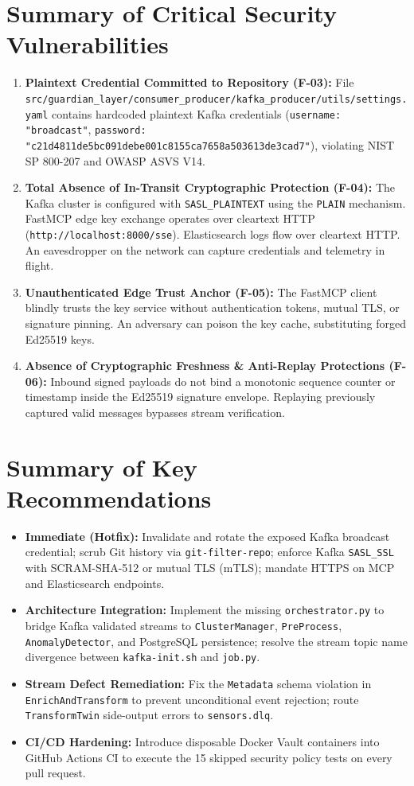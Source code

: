 \documentclass[10pt,a4paper]{report}
\begin{document}
\section{Summary of Critical Security Vulnerabilities}
\begin{enumerate}[leftmargin=*]
  \item \textbf{Plaintext Credential Committed to Repository (F-03):} File \texttt{src/guardian\_layer/consumer\_producer/kafka\_producer/utils/settings.yaml} contains hardcoded plaintext Kafka credentials (\texttt{username: "broadcast"}, \texttt{password: "c21d4811de5bc091debe001c8155ca7658a503613de3cad7"}), violating NIST SP 800-207 and OWASP ASVS V14.
  \item \textbf{Total Absence of In-Transit Cryptographic Protection (F-04):} The Kafka cluster is configured with \texttt{SASL\_PLAINTEXT} using the \texttt{PLAIN} mechanism. FastMCP edge key exchange operates over cleartext HTTP (\texttt{http://localhost:8000/sse}). Elasticsearch logs flow over cleartext HTTP. An eavesdropper on the network can capture credentials and telemetry in flight.
  \item \textbf{Unauthenticated Edge Trust Anchor (F-05):} The FastMCP client blindly trusts the key service without authentication tokens, mutual TLS, or signature pinning. An adversary can poison the key cache, substituting forged Ed25519 keys.
  \item \textbf{Absence of Cryptographic Freshness \& Anti-Replay Protections (F-06):} Inbound signed payloads do not bind a monotonic sequence counter or timestamp inside the Ed25519 signature envelope. Replaying previously captured valid messages bypasses stream verification.
\end{enumerate}

\section{Summary of Key Recommendations}
\begin{itemize}[leftmargin=*]
  \item \textbf{Immediate (Hotfix):} Invalidate and rotate the exposed Kafka broadcast credential; scrub Git history via \texttt{git-filter-repo}; enforce Kafka \texttt{SASL\_SSL} with SCRAM-SHA-512 or mutual TLS (mTLS); mandate HTTPS on MCP and Elasticsearch endpoints.
  \item \textbf{Architecture Integration:} Implement the missing \texttt{orchestrator.py} to bridge Kafka validated streams to \texttt{ClusterManager}, \texttt{PreProcess}, \texttt{AnomalyDetector}, and PostgreSQL persistence; resolve the stream topic name divergence between \texttt{kafka-init.sh} and \texttt{job.py}.
  \item \textbf{Stream Defect Remediation:} Fix the \texttt{Metadata} schema violation in \texttt{EnrichAndTransform} to prevent unconditional event rejection; route \texttt{TransformTwin} side-output errors to \texttt{sensors.dlq}.
  \item \textbf{CI/CD Hardening:} Introduce disposable Docker Vault containers into GitHub Actions CI to execute the 15 skipped security policy tests on every pull request.
\end{itemize}
\end{document}
